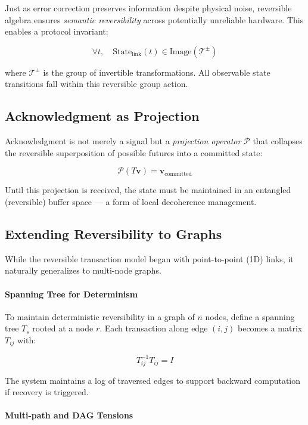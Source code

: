 \documentclass[../../../OAE-SPEC-MAIN.tex]{subfiles}
\begin{document}
Just as error correction preserves information despite physical noise, reversible algebra ensures \emph{semantic reversibility} across potentially unreliable hardware. This enables a protocol invariant:

\[
\forall t, \quad \text{State}_{\text{link}}(t) \in \text{Image}(\mathcal{T}^{\pm})
\]

where $\mathcal{T}^{\pm}$ is the group of invertible transformations. All observable state transitions fall within this reversible group action.

\subsection*{Acknowledgment as Projection}

Acknowledgment is not merely a signal but a \emph{projection operator} $\mathcal{P}$ that collapses the reversible superposition of possible futures into a committed state:

\[
\mathcal{P}(T\mathbf{v}) = \mathbf{v}_{\text{committed}}
\]

Until this projection is received, the state must be maintained in an entangled (reversible) buffer space — a form of local decoherence management.

\subsection*{Extending Reversibility to Graphs}

While the reversible transaction model began with point-to-point (1D) links, it naturally generalizes to multi-node graphs.

\paragraph{Spanning Tree for Determinism}

To maintain deterministic reversibility in a graph of $n$ nodes, define a spanning tree $T_s$ rooted at a node $r$. Each transaction along edge $(i, j)$ becomes a matrix $T_{ij}$ with:

\[
T_{ij}^{-1} T_{ij} = I
\]

The system maintains a log of traversed edges to support backward computation if recovery is triggered.

\paragraph{Multi-path and DAG Tensions}
\end{document}
